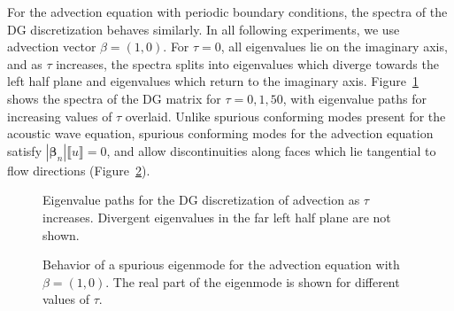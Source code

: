 \documentclass[preprint,10pt]{elsarticle}
\newcommand{\LRb}[1]{\left| #1 \right|}
\newcommand{\jump}[1] {\ensuremath{\llbracket#1\rrbracket}}
\begin{document}

For the advection equation with periodic boundary conditions, the spectra of the DG discretization behaves similarly.  In all following experiments, we use advection vector $\beta = (1,0)$.  For $\tau=0$, all eigenvalues lie on the imaginary axis, and as $\tau$ increases, the spectra splits into eigenvalues which diverge towards the left half plane and eigenvalues which return to the imaginary axis.  Figure~\ref{fig:trackModesAdvec} shows the spectra of the DG matrix for $\tau = 0,1,50$, with eigenvalue paths for increasing values of $\tau$ overlaid.  Unlike spurious conforming modes present for the acoustic wave equation, spurious conforming modes for the advection equation satisfy $\LRb{\bm{\beta}_n}\jump{ u} = 0$, and allow discontinuities along faces which lie tangential to flow directions (Figure~\ref{fig:trackModesAdvecU}).  


\begin{figure}
\centering
{}
\hspace{2em}
\caption{Eigenvalue paths for the DG discretization of advection as $\tau$ increases.  Divergent eigenvalues in the far left half plane are not shown.  }
\label{fig:trackModesAdvec}
\end{figure}


\begin{figure}
\centering
{}
\hspace{.5em}
\hspace{.5em}
\caption{Behavior of a spurious eigenmode for the advection equation with $\beta = (1,0)$. The real part of the eigenmode is shown for different values of $\tau$.}
\label{fig:trackModesAdvecU}
\end{figure}
\end{document}
